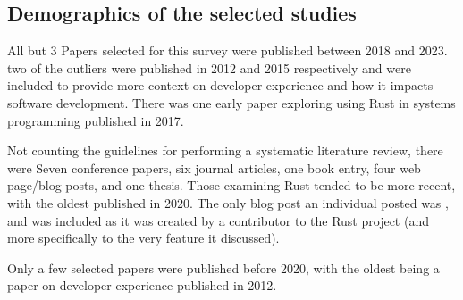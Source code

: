 \documentclass[conference]{IEEEtran}
\begin{document}
\subsection{Demographics of the selected studies}

All but 3 Papers selected for this survey were published between 2018 and 2023. two of the outliers were published in 2012\cite{fagerholmDeveloperExperienceConcept2012} and 2015\cite{graziotin2015you} respectively and were included to provide more context on developer experience and how it impacts software development. There was one early paper exploring using Rust in systems programming\cite{balasubramanianSystemProgrammingRust2017} published in 2017.

Not counting the guidelines for performing a systematic literature review\cite{GuidelinesPerformingSystematic}, there were
Seven conference papers, six journal articles, one book entry, four web page/blog posts, and one thesis. Those examining Rust tended to be more recent, with the oldest published in 2020\cite{sudwojRustProgrammingLanguage2020}. The only blog post an individual posted was \cite{saoirseWhyAsyncRust2023}, and was included as it was created by a contributor to the Rust project (and more specifically to the very feature it discussed).

Only a few selected papers were published before 2020, with the oldest being a paper on developer experience published in 2012\cite{fagerholmDeveloperExperienceConcept2012}.
\vspace{3ex}

\startchronology[startyear=2012,stopyear=2020,height=1pt,  startdate=true, stopdate=true, arrow=false, width=\hsize, box=false]
\stopchronology
\end{document}
